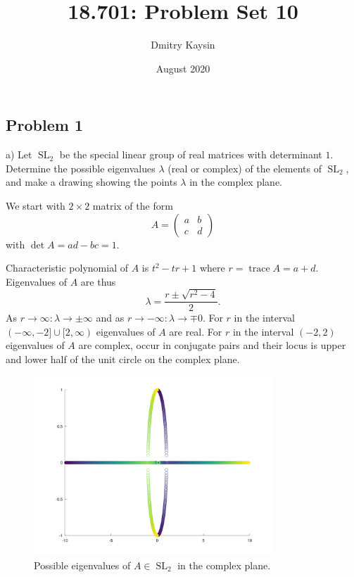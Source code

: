 \documentclass{article}
\title{18.701: Problem Set 10}
\author{Dmitry Kaysin}
\date{August 2020}
\theoremstyle{definition}
\newcommand{\trace}{\operatorname{trace}}
\newcommand{\SL}{\operatorname{SL}}
\begin{document}
\maketitle 


\subsection*{Problem 1}

\begin{tcolorbox}
a) Let $\SL_2$ be the special linear group of real matrices with determinant $1$.
Determine the possible eigenvalues $\lambda$ (real or complex) of the elements of $\SL_2$, and make a drawing showing the points $\lambda$ in the complex plane.
\end{tcolorbox}

We start with $2 \times 2$ matrix of the form
\[
    A =
    \begin{pmatrix}
        a & b \\
        c & d
    \end{pmatrix}
\]
with $\det A = ad - bc = 1$.

Characteristic polynomial of $A$ is $t^2 - tr + 1$ where $r = \trace A = a+d$.
Eigenvalues of $A$ are thus
\[
    \lambda = \frac{r \pm \sqrt{r^2-4}}{2}.
\]
As $r \to \infty : \lambda \to \pm \infty$ and
as $r \to -\infty : \lambda \to \mp 0$.
For $r$ in the interval $(-\infty, -2] \cup [2, \infty)$ eigenvalues of $A$ are real.
For $r$ in the interval $(-2, 2)$ eigenvalues of $A$ are complex, occur in conjugate pairs and their locus is upper and lower half of the unit circle on the complex plane.

\begin{figure}[h]
    \caption{Possible eigenvalues of $A \in \SL_2$ in the complex plane.}
    \centering
    \includegraphics[width=0.8\textwidth]{ps10p1}
\end{figure}
\end{document}
